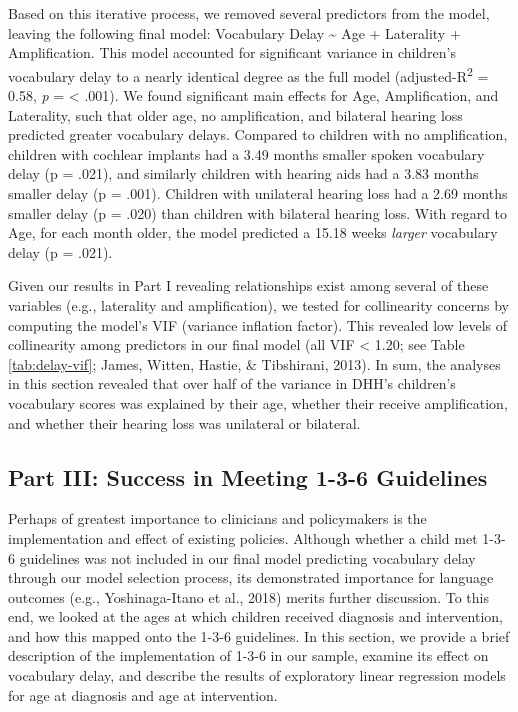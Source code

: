 \documentclass[english,man]{apa6}
\begin{document}
Based on this iterative process, we removed several predictors from the model, leaving the following final model: Vocabulary Delay \textasciitilde{} Age + Laterality + Amplification. This model accounted for significant variance in children's vocabulary delay to a nearly identical degree as the full model (adjusted-R\textsuperscript{2} = 0.58, \emph{p} = \textless{} .001). We found significant main effects for Age, Amplification, and Laterality, such that older age, no amplification, and bilateral hearing loss predicted greater vocabulary delays. Compared to children with no amplification, children with cochlear implants had a 3.49 months smaller spoken vocabulary delay (p = .021), and similarly children with hearing aids had a 3.83 months smaller delay (p = .001). Children with unilateral hearing loss had a 2.69 months smaller delay (p = .020) than children with bilateral hearing loss. With regard to Age, for each month older, the model predicted a 15.18 weeks \emph{larger} vocabulary delay (p = .021).

Given our results in Part I revealing relationships exist among several of these variables (e.g., laterality and amplification), we tested for collinearity concerns by computing the model's VIF (variance inflation factor). This revealed low levels of collinearity among predictors in our final model (all VIF \textless{} 1.20; see Table \ref{tab:delay-vif}; James, Witten, Hastie, \& Tibshirani, 2013). In sum, the analyses in this section revealed that over half of the variance in DHH's children's vocabulary scores was explained by their age, whether their receive amplification, and whether their hearing loss was unilateral or bilateral.

\hypertarget{part-iii-success-in-meeting-1-3-6-guidelines}{%
\subsection{Part III: Success in Meeting 1-3-6 Guidelines}\label{part-iii-success-in-meeting-1-3-6-guidelines}}

Perhaps of greatest importance to clinicians and policymakers is the implementation and effect of existing policies. Although whether a child met 1-3-6 guidelines was not included in our final model predicting vocabulary delay through our model selection process, its demonstrated importance for language outcomes (e.g., Yoshinaga-Itano et al., 2018) merits further discussion. To this end, we looked at the ages at which children received diagnosis and intervention, and how this mapped onto the 1-3-6 guidelines. In this section, we provide a brief description of the implementation of 1-3-6 in our sample, examine its effect on vocabulary delay, and describe the results of exploratory linear regression models for age at diagnosis and age at intervention.
\end{document}
